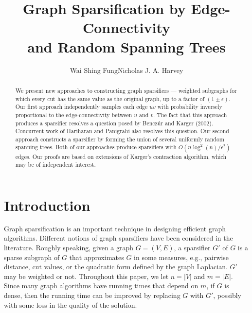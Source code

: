 \documentclass[11pt]{article}
\title{Graph Sparsification by Edge-Connectivity \\ and Random Spanning Trees}
\author{Wai Shing Fung\footnotemark[1] \qquad Nicholas J. A. Harvey\footnotemark[1]
}
\date{}
\numberwithin{equation}{section}
\renewcommand{\thefootnote}{\fnsymbol{footnote}}
\begin{document}
\maketitle
    \renewcommand{\thefootnote}{\fnsymbol{footnote}}
    \renewcommand{\thefootnote}{\arabic{footnote}}

\begin{abstract}
We present new approaches to constructing graph sparsifiers --- weighted subgraphs
for which every cut has the same value as the original graph, up to a factor of $(1 \pm \epsilon)$.
Our first approach independently samples each edge $uv$ with probability
inversely proportional to the edge-connectivity between $u$ and $v$.
The fact that this approach produces a sparsifier resolves a question
posed by Bencz\'ur and Karger (2002).
Concurrent work of Hariharan and Panigrahi also resolves this question.
Our second approach constructs a sparsifier by forming the union 
of several uniformly random spanning trees.
Both of our approaches produce sparsifiers with $O(n \log^2(n)/\epsilon^2)$ edges.
Our proofs are based on extensions of Karger's contraction algorithm,
which may be of independent interest.
\end{abstract}



\section{Introduction}

Graph sparsification is an important technique in designing efficient graph algorithms.
Different notions of graph sparsifiers have been considered in the literature.
Roughly speaking, given a graph $G=(V,E)$, a sparsifier $G'$ of $G$
is a sparse subgraph of $G$ that approximates $G$ in some measures, 
e.g., pairwise distance, cut values,
or the quadratic form defined by the graph Laplacian.
$G'$ may be weighted or not.
Throughout this paper, we let $n = |V|$ and $m = |E|$.
Since many graph algorithms have running times that depend on $m$,
if $G$ is dense, then the running time can be improved by replacing $G$ with $G'$,
possibly with some loss in the quality of the solution.
\end{document}
